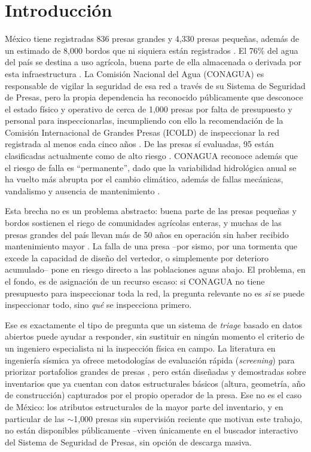 \section{Introducci\'on}
\label{sec:introduccion}

M\'exico tiene registradas 836 presas grandes y 4{,}330 presas peque\~nas, adem\'as de un estimado de 8{,}000 bordos que ni siquiera est\'an registrados \cite{infobae2020presas}. El 76\% del agua del pa\'is se destina a uso agr\'icola, buena parte de ella almacenada o derivada por esta infraestructura \cite{conagua2018estadisticas}. La Comisi\'on Nacional del Agua (CONAGUA) es responsable de vigilar la seguridad de esa red a trav\'es de su Sistema de Seguridad de Presas, pero la propia dependencia ha reconocido p\'ublicamente que desconoce el estado f\'isico y operativo de cerca de 1{,}000 presas por falta de presupuesto y personal para inspeccionarlas, incumpliendo con ello la recomendaci\'on de la Comisi\'on Internacional de Grandes Presas (ICOLD) de inspeccionar la red registrada al menos cada cinco a\~nos \cite{infobae2020presas, eluniversal2021presas}. De las presas s\'i evaluadas, 95 est\'an clasificadas actualmente como de alto riesgo \cite{infobae2020presas}. CONAGUA reconoce adem\'as que el riesgo de falla es ``permanente'', dado que la variabilidad hidrol\'ogica anual se ha vuelto m\'as abrupta por el cambio clim\'atico, adem\'as de fallas mec\'anicas, vandalismo y ausencia de mantenimiento \cite{infobae2020presas}.

Esta brecha no es un problema abstracto: buena parte de las presas peque\~nas y bordos sostienen el riego de comunidades agr\'icolas enteras, y muchas de las presas grandes del pa\'is llevan m\'as de 50 a\~nos en operaci\'on sin haber recibido mantenimiento mayor \cite{tecscience2023infraestructura}. La falla de una presa --por sismo, por una tormenta que excede la capacidad de dise\~no del vertedor, o simplemente por deterioro acumulado-- pone en riesgo directo a las poblaciones aguas abajo. El problema, en el fondo, es de asignaci\'on de un recurso escaso: si CONAGUA no tiene presupuesto para inspeccionar toda la red, la pregunta relevante no es \emph{si} se puede inspeccionar todo, sino \emph{qu\'e} se inspecciona primero.

Ese es exactamente el tipo de pregunta que un sistema de \emph{triage} basado en datos abiertos puede ayudar a responder, sin sustituir en ning\'un momento el criterio de un ingeniero especialista ni la inspecci\'on f\'isica en campo. La literatura en ingenier\'ia s\'ismica ya ofrece metodolog\'ias de evaluaci\'on r\'apida (\emph{screening}) para priorizar portafolios grandes de presas \cite{hariri2018prioritization, natural2023multiscale}, pero est\'an dise\~nadas y demostradas sobre inventarios que ya cuentan con datos estructurales b\'asicos (altura, geometr\'ia, a\~no de construcci\'on) capturados por el propio operador de la presa. Ese no es el caso de M\'exico: los atributos estructurales de la mayor parte del inventario, y en particular de las \(\sim\)1{,}000 presas sin supervisi\'on reciente que motivan este trabajo, no est\'an disponibles p\'ublicamente --viven \'unicamente en el buscador interactivo del Sistema de Seguridad de Presas, sin opci\'on de descarga masiva.

